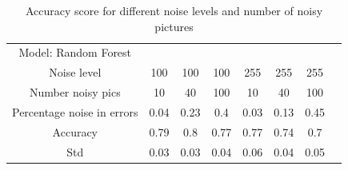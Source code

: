 \documentclass{article}
\begin{document}
\begin{table}[H]
\centering
    \begin{tabular}{c|c|c|c|c|c|c|c}
   Model: Random Forest \\
    Noise level  & 100 & 100 & 100 & 255 & 255 & 255 \\
       Number noisy pics & 10 & 40 & 100 & 10& 40 & 100 \\
        Percentage noise in errors & 0.04& 0.23 & 0.4 & 0.03 & 0.13& 0.45\\
       Accuracy & 0.79 & 0.8 & 0.77 & 0.77 & 0.74 & 0.7 \\
       Std & 0.03& 0.03 & 0.04 & 0.06 & 0.04 & 0.05\\
    \end{tabular}
    \caption{Accuracy score for different noise levels and number of noisy pictures}
    \label{RF table}
\end{table}
\end{document}
